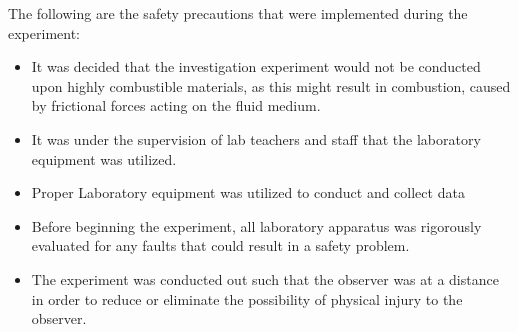 

{The following are the safety precautions that were implemented during the experiment:}

	\begin{itemize}
		\item {It was decided that the investigation experiment would not be conducted upon highly combustible materials, as this might result in combustion, caused by frictional forces acting on the fluid medium.}
		\item {It was under the supervision of lab teachers and staff that the laboratory equipment was utilized.}
		\item {Proper Laboratory equipment was utilized to conduct and collect data}
		\item {Before beginning the experiment, all laboratory apparatus was rigorously evaluated for any faults that could result in a safety problem.}
		\item {The experiment was conducted out such that the observer was at a distance in order to reduce or eliminate the possibility of physical injury to the observer.}
	\end{itemize}

